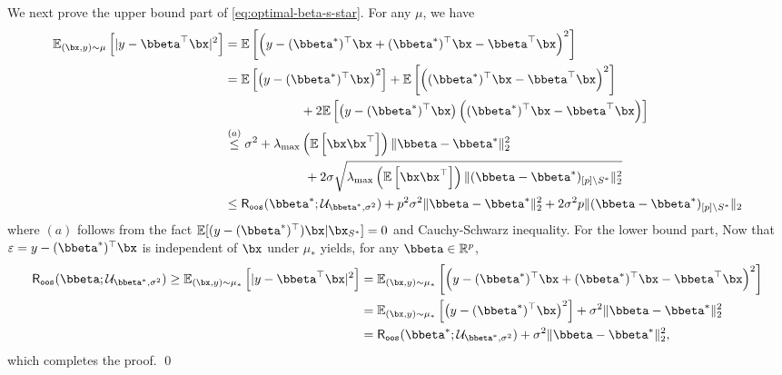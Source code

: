 \documentclass[10pt]{article}
\numberwithin{equation}{section}
\begin{document}
We next prove the upper bound part of \eqref{eq:optimal-beta-s-star}. For any $\mu$, we have
\begin{align*}
    \mathbb{E}_{(\bx,y)\sim \mu} \left[ |y - \bbeta^\top \bx|^2 \right] &= \mathbb{E}\left[\left(y - (\bbeta^*)^\top\bx + (\bbeta^*)^\top\bx - \bbeta^\top \bx\right)^2\right] \\
    &= \mathbb{E}\left[\left(y - (\bbeta^*)^\top\bx \right)^2\right] + \mathbb{E} \left[ \left((\bbeta^*)^\top\bx - \bbeta^\top \bx\right)^2 \right] \\ 
    & ~~~~~~~~~~~~~~~~~~ + 2 \mathbb{E}\left[\left(y - (\bbeta^*)^\top\bx \right) \left((\bbeta^*)^\top\bx - \bbeta^\top \bx\right) \right] \\
    &\overset{(a)}{\le} \sigma^2 + \lambda_{\max} \left(\mathbb{E}\left[\bx\bx^\top\right]\right) \|\bbeta - \bbeta^*\|^2_2 \\
    &~~~~~~~~~~~~~~~~~~~ + 2\sigma \sqrt{\lambda_{\max} \left(\mathbb{E}\left[\bx\bx^\top\right]\right) \|(\bbeta - \bbeta^*)_{[p]\setminus S^*}\|^2_2} \\
    &\le \mathsf{R}_{\mathtt{oos}}(\bbeta^*;\mathcal{U}_{\bbeta^*, \sigma^2}) + p^2\sigma^2 \|\bbeta - \bbeta^*\|_2^2 + 2\sigma^2 p  \|(\bbeta - \bbeta^*)_{[p]\setminus S^*}\|_2
\end{align*} where $(a)$ follows from the fact $\mathbb{E}[(y-(\bbeta^*)^\top)\bx|\bx_{S^*}]=0$ and Cauchy-Schwarz inequality.
For the lower bound part, 
Now that $\varepsilon = y - (\bbeta^*)^\top \bx$ is independent of $\bx$ under $\mu_*$  yields, for any $\bbeta \in \mathbb{R}^p$,
\begin{align*}
    \mathsf{R}_{\mathtt{oos}}(\bbeta;\mathcal{U}_{\bbeta^*, \sigma^2}) \ge \mathbb{E}_{(\bx,y)\sim\mu_*} \left[|y-\bbeta^\top \bx|^2\right] &= \mathbb{E}_{(\bx,y)\sim \mu_*} \left[\left(y - (\bbeta^*)^\top \bx +  (\bbeta^*)^\top \bx - \bbeta^\top \bx\right)^2\right] \\
    &= \mathbb{E}_{(\bx,y)\sim \mu_*} \left[\left(y - (\bbeta^*)^\top \bx\right)^2\right] + \sigma^2 \|\bbeta - \bbeta^*\|_2^2 \\
    &= \mathsf{R}_{\mathtt{oos}}(\bbeta^*;\mathcal{U}_{\bbeta^*,\sigma^2}) + \sigma^2 \|\bbeta - \bbeta^*\|_2^2,
\end{align*} which completes the proof. \qed
\end{document}
